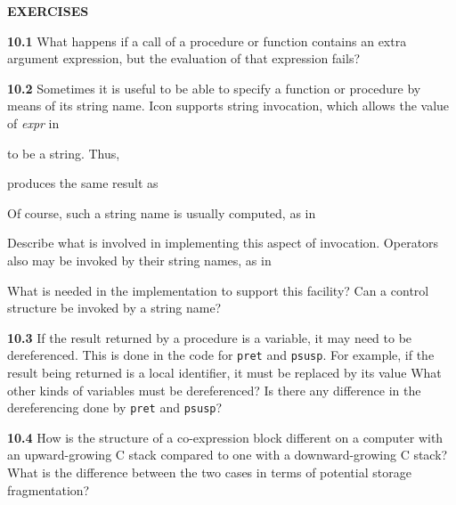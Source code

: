 \bigskip

\noindent\textbf{EXERCISES}

\textbf{10.1} What happens if a call of a procedure or function
contains an extra argument expression, but the evaluation of that
expression fails?

\textbf{10.2} Sometimes it is useful to be able to specify a function
or procedure by means of its string name. Icon supports
{\textquotedbl}string invocation,{\textquotedbl} which allows the
value of \textit{expr} in

\goodbreak
{}

\noindent to be a string. Thus,


\noindent produces the same result as


Of course, such a string name is usually computed, as in


Describe what is involved in implementing this aspect of
invocation. Operators also may be invoked by their string names, as in


What is needed in the implementation to support this facility? Can a
control structure be invoked by a string name?

\textbf{10.3} If the result returned by a procedure is a variable, it
may need to be dereferenced. This is done in the code for
\texttt{pret} and \texttt{psusp}. For example, if the result being
returned is a local identifier, it must be replaced by its value What
other kinds of variables must be dereferenced? Is there any difference
in the dereferencing done by \texttt{pret} and \texttt{psusp}?

\textbf{10.4} How is the structure of a co-expression block different
on a computer with an upward-growing C stack compared to one with a
downward-growing C stack? What is the difference between the two cases
in terms of potential storage fragmentation?

